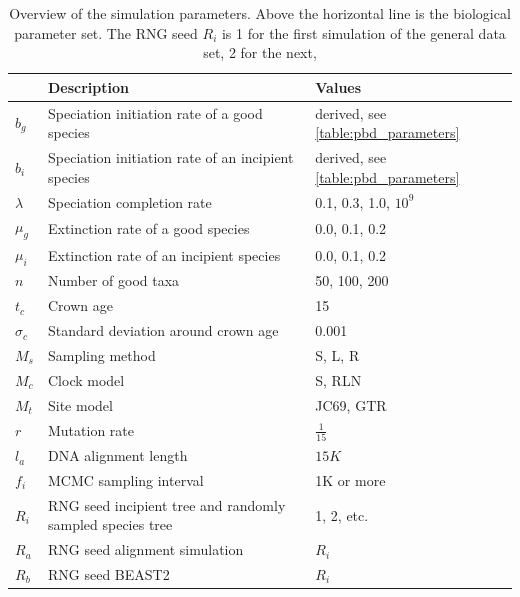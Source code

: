 \begin{table}
  \centering 
  \begin{tabular}{p{} p{} p{}}
    \hline
                          & Description & Values \\
    \hline
    \hline
    $b_g$                 & Speciation initiation rate of a good species & derived, see \ref{table:pbd_parameters} \\
    $b_i$                 & Speciation initiation rate of an incipient species & derived, see \ref{table:pbd_parameters} \\
    $\lambda$             & Speciation completion rate & 0.1, 0.3, 1.0, $10^9$ \\
    $\mu_g$               & Extinction rate of a good species & 0.0, 0.1, 0.2 \\
    $\mu_i$               & Extinction rate of an incipient species & 0.0, 0.1, 0.2 \\
    \hline
    $n$                   & Number of good taxa & 50, 100, 200 \\
    $t_c$                 & Crown age & 15 \\
    $\sigma_c$            & Standard deviation around crown age & 0.001 \\
    $M_s$                 & Sampling method & S, L, R \\
    $M_c$                 & Clock model & S, RLN \\
    $M_t$                 & Site model & JC69, GTR \\
    $r$                   & Mutation rate & $\frac{1}{15}$ \\
    $l_a$                 & DNA alignment length & $15K$ \\
    $f_i$                 & MCMC sampling interval & 1K or more \\
    $R_i$                 & RNG seed incipient tree and randomly sampled species tree & 1, 2, etc. \\
    $R_a$                 & RNG seed alignment simulation & $R_i$ \\
    $R_b$                 & RNG seed BEAST2 & $R_i$ \\
    \hline
  \end{tabular}
  \caption{
    Overview of the simulation parameters. Above the horizontal line is 
    the biological parameter set. 
    The RNG seed $R_i$ is 1 for the first simulation of the general data set, 2 for the next,
}
\end{table}

